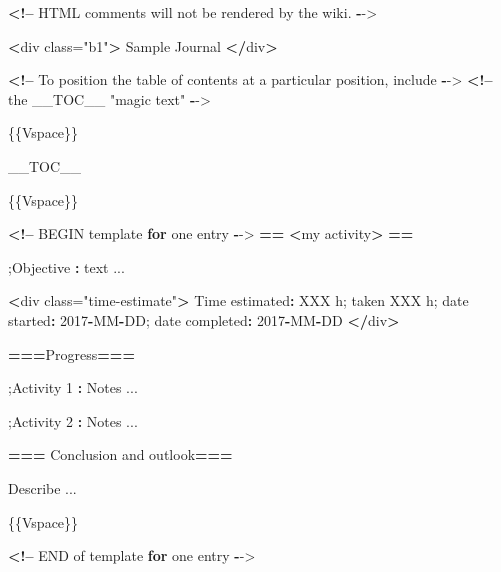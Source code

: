 \documentclass[]{book}
\newenvironment{Shaded}{\begin{snugshade}}{\end{snugshade}}
\newcommand{\DecValTok}[1]{\textcolor[rgb]{0.00,0.00,0.81}{#1}}
\newcommand{\StringTok}[1]{\textcolor[rgb]{0.31,0.60,0.02}{#1}}
\newcommand{\ControlFlowTok}[1]{\textcolor[rgb]{0.13,0.29,0.53}{\textbf{#1}}}
\newcommand{\OperatorTok}[1]{\textcolor[rgb]{0.81,0.36,0.00}{\textbf{#1}}}
\newcommand{\ErrorTok}[1]{\textcolor[rgb]{0.64,0.00,0.00}{\textbf{#1}}}
\newcommand{\NormalTok}[1]{#1}
\begin{document}
\begin{Shaded}
\begin{Highlighting}[]
\OperatorTok{<!--}\StringTok{ }\NormalTok{HTML comments will not be rendered by the wiki. }\OperatorTok{-}\NormalTok{->}

\ErrorTok{<}\NormalTok{div class=}\StringTok{"b1"}\OperatorTok{>}
\NormalTok{Sample Journal}
\OperatorTok{<}\ErrorTok{/}\NormalTok{div}\OperatorTok{>}

\ErrorTok{<}\OperatorTok{!--}\StringTok{ }\NormalTok{To position the table of contents at a particular position, include }\OperatorTok{-}\NormalTok{->}
\ErrorTok{<}\OperatorTok{!--}\StringTok{ }\NormalTok{the __TOC__ }\StringTok{"magic text"} \OperatorTok{-}\NormalTok{->}

\NormalTok{\{\{Vspace\}\}}

\NormalTok{__TOC__}

\NormalTok{\{\{Vspace\}\}}

\OperatorTok{<!--}\StringTok{ }\NormalTok{BEGIN template }\ControlFlowTok{for}\NormalTok{ one entry }\OperatorTok{-}\NormalTok{->}
\ErrorTok{==}\StringTok{ }\ErrorTok{<}\NormalTok{my activity}\OperatorTok{>}\StringTok{ }\ErrorTok{==}

\NormalTok{;Objective}
\OperatorTok{:}\StringTok{ }\NormalTok{text ...}

\OperatorTok{<}\NormalTok{div class=}\StringTok{"time-estimate"}\OperatorTok{>}
\NormalTok{Time estimated}\OperatorTok{:}\StringTok{ }\NormalTok{XXX h; taken XXX h; date started}\OperatorTok{:}\StringTok{ }\DecValTok{2017}\OperatorTok{-}\NormalTok{MM}\OperatorTok{-}\NormalTok{DD; date completed}\OperatorTok{:}\StringTok{ }\DecValTok{2017}\OperatorTok{-}\NormalTok{MM}\OperatorTok{-}\NormalTok{DD}
\OperatorTok{<}\ErrorTok{/}\NormalTok{div}\OperatorTok{>}

\ErrorTok{===}\NormalTok{Progress}\OperatorTok{==}\ErrorTok{=}

\NormalTok{;Activity }\DecValTok{1}
\OperatorTok{:}\StringTok{ }\NormalTok{Notes ...}

\NormalTok{;Activity }\DecValTok{2}
\OperatorTok{:}\StringTok{ }\NormalTok{Notes ...}

\OperatorTok{==}\ErrorTok{=}\StringTok{ }\NormalTok{Conclusion and outlook}\OperatorTok{==}\ErrorTok{=}

\NormalTok{Describe ...}

\NormalTok{\{\{Vspace\}\}}

\OperatorTok{<!--}\StringTok{ }\NormalTok{END of template }\ControlFlowTok{for}\NormalTok{ one entry }\OperatorTok{-}\NormalTok{->}



\end{Highlighting}
\end{Shaded}
\end{document}
